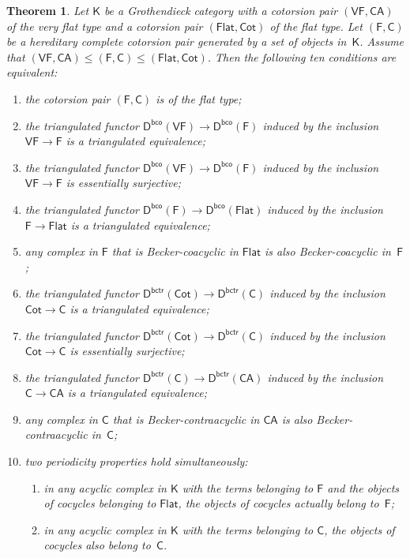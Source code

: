 \documentclass[12pt,a4paper]{amsart}
\newcommand{\+}{\nobreakdash-}
\renewcommand{\:}{\colon}
\newcommand{\rarrow}{\longrightarrow}
\newcommand{\sC}{\mathsf C}
\newcommand{\sD}{\mathsf D}
\newcommand{\sF}{\mathsf F}
\newcommand{\sK}{\mathsf K}
\newcommand{\VF}{\mathsf{VF}}
\newcommand{\CA}{\mathsf{CA}}
\newcommand{\Flat}{\mathsf{Flat}}
\newcommand{\Cot}{\mathsf{Cot}}
\newcommand{\bco}{\mathsf{bco}}
\newcommand{\bctr}{\mathsf{bctr}}
\theoremstyle{plain}
\newtheorem{thm}{Theorem}[section]
\theoremstyle{definition}
\begin{document}
\begin{thm} \label{sandwiched-equivalent-conditions-theorem}
 Let\/ $\sK$ be a Grothendieck category with a cotorsion pair
$(\VF,\CA)$ of the very flat type and a cotorsion pair $(\Flat,\Cot)$
of the flat type.
 Let $(\sF,\sC)$ be a hereditary complete cotorsion pair generated by
a set of objects in\/~$\sK$.
 Assume that $(\VF,\CA)\le(\sF,\sC)\le(\Flat,\Cot)$.
 Then the following ten conditions are equivalent:
\begin{enumerate}
\item the cotorsion pair $(\sF,\sC)$ is of the flat type;
\item the triangulated functor\/ $\sD^\bco(\VF)\rarrow\sD^\bco(\sF)$
induced by the inclusion\/ $\VF\rarrow\sF$ is a triangulated
equivalence;
\item the triangulated functor\/ $\sD^\bco(\VF)\rarrow\sD^\bco(\sF)$
induced by the inclusion\/ $\VF\rarrow\sF$ is essentially surjective;
\item the triangulated functor\/ $\sD^\bco(\sF)\rarrow\sD^\bco(\Flat)$
induced by the inclusion\/ $\sF\rarrow\Flat$ is a triangulated
equivalence;
\item any complex in\/ $\sF$ that is Becker-coacyclic in\/ $\Flat$ is
also Becker-coacyclic in\/~$\sF$;
\item the triangulated functor\/ $\sD^\bctr(\Cot)\rarrow\sD^\bctr(\sC)$
induced by the inclusion\/ $\Cot\rarrow\sC$ is a triangulated
equivalence;
\item the triangulated functor\/ $\sD^\bctr(\Cot)\rarrow\sD^\bctr(\sC)$
induced by the inclusion\/ $\Cot\rarrow\sC$ is essentially surjective;
\item the triangulated functor\/ $\sD^\bctr(\sC)\rarrow\sD^\bctr(\CA)$
induced by the inclusion\/ $\sC\rarrow\CA$ is a triangulated
equivalence;
\item any complex in\/ $\sC$ that is Becker-contraacyclic in\/ $\CA$ is
also Becker-con\-tra\-acyclic in\/~$\sC$;
\item two periodicity properties hold simultaneously:
\begin{enumerate}
\renewcommand{\theenumii}{\alph{enumii}}
\item in any acyclic complex in\/ $\sK$ with the terms belonging to\/
$\sF$ and the objects of cocycles belonging to\/ $\Flat$, the objects
of cocycles actually belong to\/~$\sF$;
\item in any acyclic complex in\/ $\sK$ with the terms belonging to\/
$\sC$, the objects of cocycles also belong to\/~$\sC$.
\end{enumerate}
\end{enumerate}
\end{thm}
\end{document}
